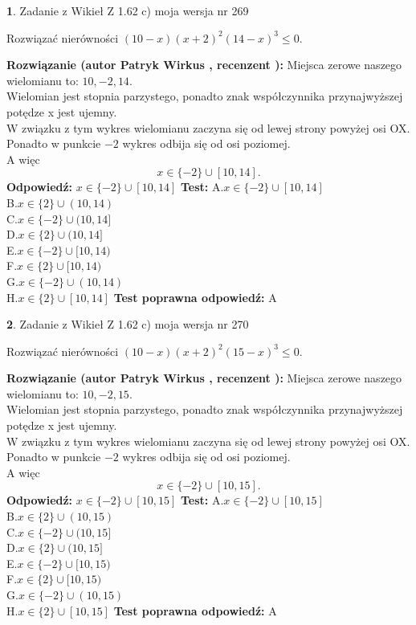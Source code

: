 \documentclass[12pt, a4paper]{article}
\theoremstyle{definition} %
\newtheorem{zad}{}
\newcommand{\zadStart}[1]{\begin{zad}#1\newline}
\newcommand{\zadStop}{\end{zad}}
\newcommand{\rozwStart}[2]{\noindent \textbf{Rozwiązanie (autor #1 , recenzent #2): }\newline}
\newcommand{\rozwStop}{\newline}
\newcommand{\odpStart}{\noindent \textbf{Odpowiedź:}\newline}
\newcommand{\odpStop}{\newline}
\newcommand{\testStart}{\noindent \textbf{Test:}\newline}
\newcommand{\testStop}{\newline}
\newcommand{\kluczStart}{\noindent \textbf{Test poprawna odpowiedź:}\newline}
\newcommand{\kluczStop}{\newline}
\begin{document}
\zadStart{Zadanie z Wikieł Z 1.62 c) moja wersja nr 269}

Rozwiązać nierówności $(10-x)(x+2)^{2}(14-x)^{3}\le0$.
\zadStop
\rozwStart{Patryk Wirkus}{}
Miejsca zerowe naszego wielomianu to: $10, -2, 14$.\\
Wielomian jest stopnia parzystego, ponadto znak współczynnika przy\linebreak najwyższej potędze x jest ujemny.\\ W związku z tym wykres wielomianu zaczyna się od lewej strony powyżej osi OX.\\
Ponadto w punkcie $-2$ wykres odbija się od osi poziomej.\\
A więc $$x \in \{-2\} \cup [10,14].$$
\rozwStop
\odpStart
$x \in \{-2\} \cup [10,14]$
\odpStop
\testStart
A.$x \in \{-2\} \cup [10,14]$\\
B.$x \in \{2\} \cup (10,14)$\\
C.$x \in \{-2\} \cup (10,14]$\\
D.$x \in \{2\} \cup (10,14]$\\
E.$x \in \{-2\} \cup [10,14)$\\
F.$x \in \{2\} \cup [10,14)$\\
G.$x \in \{-2\} \cup (10,14)$\\
H.$x \in \{2\} \cup [10,14]$
\testStop
\kluczStart
A
\kluczStop



\zadStart{Zadanie z Wikieł Z 1.62 c) moja wersja nr 270}

Rozwiązać nierówności $(10-x)(x+2)^{2}(15-x)^{3}\le0$.
\zadStop
\rozwStart{Patryk Wirkus}{}
Miejsca zerowe naszego wielomianu to: $10, -2, 15$.\\
Wielomian jest stopnia parzystego, ponadto znak współczynnika przy\linebreak najwyższej potędze x jest ujemny.\\ W związku z tym wykres wielomianu zaczyna się od lewej strony powyżej osi OX.\\
Ponadto w punkcie $-2$ wykres odbija się od osi poziomej.\\
A więc $$x \in \{-2\} \cup [10,15].$$
\rozwStop
\odpStart
$x \in \{-2\} \cup [10,15]$
\odpStop
\testStart
A.$x \in \{-2\} \cup [10,15]$\\
B.$x \in \{2\} \cup (10,15)$\\
C.$x \in \{-2\} \cup (10,15]$\\
D.$x \in \{2\} \cup (10,15]$\\
E.$x \in \{-2\} \cup [10,15)$\\
F.$x \in \{2\} \cup [10,15)$\\
G.$x \in \{-2\} \cup (10,15)$\\
H.$x \in \{2\} \cup [10,15]$
\testStop
\kluczStart
A
\kluczStop
\end{document}
